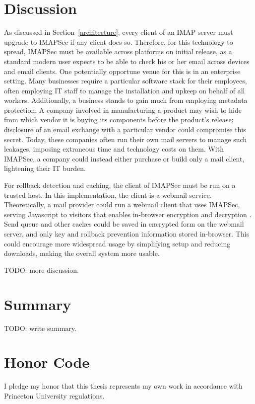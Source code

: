 \documentclass[pageno]{jpaper}
\newcommand{\project}{IMAPSec }
\newcommand{\projectnospace}{IMAPSec}
\begin{document}
\section{Discussion}
As discussed in Section~\ref{architecture}, every client of an IMAP server must upgrade to \project if any client does so. Therefore, for this technology to spread, \project must be available across platforms on initial release, as a standard modern user expects to be able to check his or her email across devices and email clients. One potentially opportune venue for this is in an enterprise setting. Many businesses require a particular software stack for their employees, often employing IT staff to manage the installation and upkeep on behalf of all workers. Additionally, a business stands to gain much from employing metadata protection. A company involved in manufacturing a product may wish to hide from which vendor it is buying its components before the product's release; disclosure of an email exchange with a particular vendor could compromise this secret. Today, these companies often run their own mail servers to manage such leakages, imposing extraneous time and technology costs on them. With \projectnospace, a company could instead either purchase or build only a mail client, lightening their IT burden.

For rollback detection and caching, the client of \project must be run on a trusted host. In this implementation, the client is a webmail service. Theoretically, a mail provider could run a webmail client that uses \projectnospace, serving Javascript to visitors that enables in-browser encryption and decryption \cite{wagner}. Send queue and other caches could be saved in encrypted form on the webmail server, and only key and rollback prevention information stored in-browser. This could encourage more widespread usage by simplifying setup and reducing downloads, making the overall system more usable.

TODO: more discussion.

\section{Summary}
TODO: write summary.

\section{Honor Code}
\label{honorcode}
I pledge my honor that this thesis represents my own work in accordance with Princeton University regulations.

\pagebreak



\end{document}
